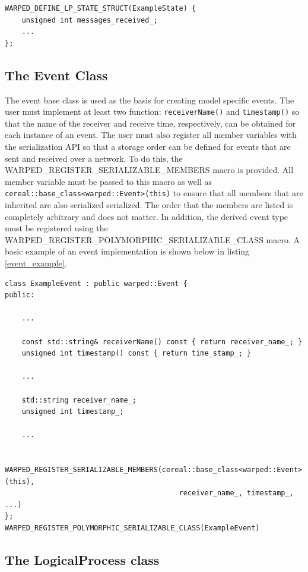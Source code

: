 \documentclass[11pt]{book}
\begin{document}
\begin{lstlisting}[caption=Example \textsc{warped2} State Definition, label=example_state, float]
WARPED_DEFINE_LP_STATE_STRUCT(ExampleState) {
    unsigned int messages_received_;
    ...
};
\end{lstlisting}

\subsection{The Event Class}

The event base class is used as the basis for creating model specific events. The user must
implement at least two function: \texttt{receiverName()} and \texttt{timestamp()} so that
the name of the receiver and receive time, respectively, can be obtained for each instance
of an event. The user must also register all member variables with the serialization API so
that a storage order can be defined for events that are sent and received over a network.
To do this, the WARPED\_REGISTER\_SERIALIZABLE\_MEMBERS macro is provided. All member
variable must be passed to this macro as well as
\texttt{cereal::base\_class<warped::Event>(this)} to ensure that all members that are
inherited are also serialized serialized. The order that the members are listed is completely
arbitrary and does not matter. In addition, the derived event type must be registered using
the WARPED\_REGISTER\_POLYMORPHIC\_SERIALIZABLE\_CLASS macro. A basic example of an event
implementation is shown below in listing \ref{event_example}.

\begin{lstlisting}[caption=Sample \textsc{warped2} Event Definition, label=event_example, float]
class ExampleEvent : public warped::Event {
public:

    ...

    const std::string& receiverName() const { return receiver_name_; }
    unsigned int timestamp() const { return time_stamp_; }

    ...

    std::string receiver_name_;
    unsigned int timestamp_;

    ...

    WARPED_REGISTER_SERIALIZABLE_MEMBERS(cereal::base_class<warped::Event>(this),
                                         receiver_name_, timestamp_, ...)
};
WARPED_REGISTER_POLYMORPHIC_SERIALIZABLE_CLASS(ExampleEvent)
\end{lstlisting}

\subsection{The LogicalProcess class}
\end{document}
